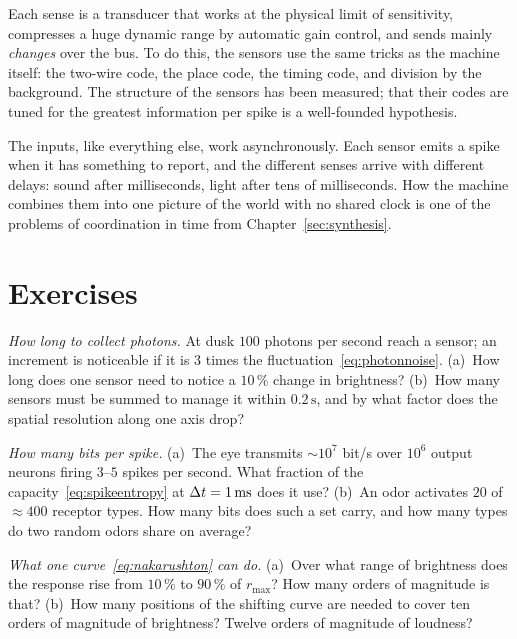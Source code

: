 \begin{keyblock}
\begin{proposition}
\label{prop:sensors}
Each sense is a transducer that works at the physical limit of sensitivity, compresses a huge dynamic range by automatic gain control, and sends mainly \emph{changes} over the  bus. To do this, the sensors use the same tricks as the machine itself: the two-wire code, the place code, the timing code, and division by the background. The structure of the sensors has been measured; that their codes are tuned for the greatest information per spike is a well-founded hypothesis.
\end{proposition}
\end{keyblock}

The inputs, like everything else, work asynchronously. Each sensor emits a spike when it has something to report, and the different senses arrive with different delays: sound after milliseconds, light after tens of milliseconds. How the machine combines them into one picture of the world with no shared clock is one of the problems of coordination in time from Chapter~\ref{sec:synthesis}.

\section{Exercises}

\begin{exercise}[\lvlA]
\label{ex:11:1}
\emph{How long to collect photons.} At dusk $100$ photons per second reach a sensor; an increment is noticeable if it is $3$ times the fluctuation~\eqref{eq:photonnoise}. (a)~How long does one sensor need to notice a $10\,\%$ change in brightness? (b)~How many sensors must be summed to manage it within $0.2\,\text{s}$, and by what factor does the spatial resolution along one axis drop?
\end{exercise}

\begin{exercise}[\lvlA]
\label{ex:11:2}
\emph{How many bits per spike.} (a)~The eye transmits $\sim10^7$ bit/s over $10^6$ output neurons firing $3$--$5$ spikes per second. What fraction of the capacity~\eqref{eq:spikeentropy} at $\Delta t=1\,\text{ms}$ does it use? (b)~An odor activates $20$ of $\approx400$ receptor types. How many bits does such a set carry, and how many types do two random odors share on average?
\end{exercise}

\begin{exercise}[\lvlB]
\label{ex:11:3}
\emph{What one curve~\eqref{eq:nakarushton} can do.} (a)~Over what range of brightness does the response rise from $10\,\%$ to $90\,\%$ of $r_{\max}$? How many orders of magnitude is that? (b)~How many positions of the shifting curve are needed to cover ten orders of magnitude of brightness? Twelve orders of magnitude of loudness?
\end{exercise}

